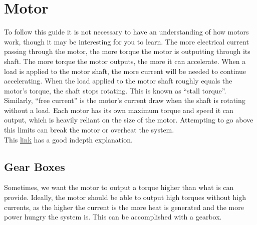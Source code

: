 \documentclass[../TinyBot.tex]{subfiles}
\begin{document}
    
\section{Motor} \label{sec:motor}

To follow this guide it is not necessary to have an understanding of how motors work,
though it may be interesting for you to learn. The more electrical current passing through
the motor, the more torque the motor is outputting through its shaft. The more torque
the motor outputs, the more it can accelerate. When a load is applied to the motor shaft,
the more current will be needed to continue accelerating. When the load applied to the
motor shaft roughly equals the motor's torque, the shaft stops rotating. This is known
as ``stall torque''. Similarly, ``free current'' is the motor's current draw when the shaft
is rotating without a load. Each motor has its own maximum torque and speed it can output,
which is heavily reliant on the size of the motor. Attempting to go above this limits
can break the motor or overheat the system. \\

This \href{https://www.explainthatstuff.com/electricmotors.html}{link} has a good indepth explanation. 

\bigskip

\subsection{Gear Boxes}

Sometimes, we want the motor to output a torque higher than what is can provide.
Ideally, the motor should be able to output high torques without high currents,
as the higher the current is the more heat is generated and the more power
hungry the system is. This can be accomplished with a gearbox. \\
\end{document}
